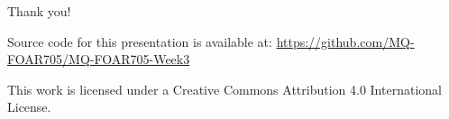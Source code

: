 \documentclass[aspectratio=1610, 11pt]{beamer} %
\begin{document}
  
%   
%   


\begin{frame}{Thank you!}


Source code for this presentation is available at: \url{https://github.com/MQ-FOAR705/MQ-FOAR705-Week3}

This work is licensed under a Creative Commons Attribution 4.0 International License.

\end{frame}
\end{document}
